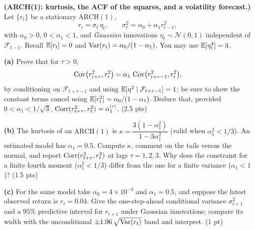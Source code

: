 \documentclass[11pt]{article}
\newcommand{\F}{\mathcal{F}}
\begin{document}
\statementstart
\textbf{(ARCH(1): kurtosis, the ACF of the squares, and a volatility forecast.)} Let $\{r_t\}$ be a stationary $\mathrm{ARCH}(1)$,
\[
r_t=\sigma_t\,\eta_t ,\qquad \sigma_t^2=\alpha_0+\alpha_1 r_{t-1}^2 ,
\]
with $\alpha_0>0$, $0<\alpha_1<1$, and \emph{Gaussian} innovations $\eta_t\sim\mathcal N(0,1)$ independent of $\F_{t-1}$. Recall $\mathbb{E}[r_t]=0$ and $\operatorname{Var}(r_t)=\alpha_0/(1-\alpha_1)$. You may use $\mathbb{E}[\eta_t^4]=3$.

\textbf{(a)} Prove that for $\tau>0$,
\[
\operatorname{Cov}\bigl(r_{t+\tau}^2,r_t^2\bigr)=\alpha_1\,\operatorname{Cov}\bigl(r_{t+\tau-1}^2,r_t^2\bigr),
\]
by conditioning on $\F_{t+\tau-1}$ and using $\E[\eta^2\mid\F_{t+\tau-1}]=1$; be sure to show the constant terms cancel using $\mathbb{E}[r_t^2]=\alpha_0/(1-\alpha_1)$. Deduce that, provided $0<\alpha_1<1/\sqrt3$, $\operatorname{Corr}(r_{t+\tau}^2,r_t^2)=\alpha_1^{\left\lvert \tau \right\rvert}$. \hfill(2.5 pts)

\textbf{(b)} The kurtosis of an $\mathrm{ARCH}(1)$ is $\kappa=\dfrac{3(1-\alpha_1^2)}{1-3\alpha_1^2}$ (valid when $\alpha_1^2<1/3$). An estimated model has $\alpha_1=0.5$. Compute $\kappa$, comment on the tails versus the normal, and report $\operatorname{Corr}(r_{t+\tau}^2,r_t^2)$ at lags $\tau=1,2,3$. Why does the constraint for a finite fourth moment ($\alpha_1^2<1/3$) differ from the one for a finite variance ($\alpha_1<1$)? \hfill(1.5 pts)

\textbf{(c)} For the same model take $\alpha_0=4\times10^{-4}$ and $\alpha_1=0.5$, and suppose the latest observed return is $r_t=0.04$. Give the one-step-ahead conditional variance $\sigma_{t+1}^2$ and a $95\%$ predictive interval for $r_{t+1}$ under Gaussian innovations; compare its width with the unconditional $\pm1.96\,\sqrt{\operatorname{Var}(r_t)}$ band and interpret. \hfill(1 pt)
\statementend
\end{document}
